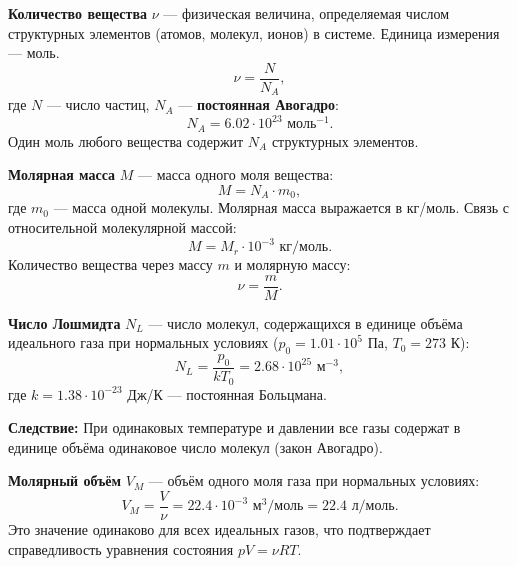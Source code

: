 \begin{definition}
\textbf{Количество вещества} $\nu$ --- физическая величина, определяемая числом структурных элементов (атомов, молекул, ионов) в системе. Единица измерения --- моль.
\begin{equation}
    \nu = \frac{N}{N_A},
\end{equation}
где $N$ --- число частиц, $N_A$ --- \textbf{постоянная Авогадро}:
\begin{equation}
    N_A = 6.02 \cdot 10^{23} \text{ моль}^{-1}.
\end{equation}
Один моль любого вещества содержит $N_A$ структурных элементов.
\end{definition}

\begin{definition}
\textbf{Молярная масса} $M$ --- масса одного моля вещества:
\begin{equation}
    M = N_A \cdot m_0,
\end{equation}
где $m_0$ --- масса одной молекулы. Молярная масса выражается в кг/моль. Связь с относительной молекулярной массой:
\begin{equation}
    M = M_r \cdot 10^{-3} \text{ кг/моль}.
\end{equation}
Количество вещества через массу $m$ и молярную массу:
\begin{equation}
    \nu = \frac{m}{M}.
\end{equation}
\end{definition}

\begin{property}
\textbf{Число Лошмидта} $N_L$ --- число молекул, содержащихся в единице объёма идеального газа при нормальных условиях ($p_0 = 1.01 \cdot 10^5$ Па, $T_0 = 273$ К):
\begin{equation}
    N_L = \frac{p_0}{k T_0} = 2.68 \cdot 10^{25} \text{ м}^{-3},
\end{equation}
где $k = 1.38 \cdot 10^{-23}$ Дж/К --- постоянная Больцмана.
\par\noindent\textbf{Следствие:} При одинаковых температуре и давлении все газы содержат в единице объёма одинаковое число молекул (закон Авогадро).
\end{property}

\begin{remark}
\textbf{Молярный объём} $V_M$ --- объём одного моля газа при нормальных условиях:
\begin{equation}
    V_M = \frac{V}{\nu} = 22.4 \cdot 10^{-3} \text{ м}^3/\text{моль} = 22.4 \text{ л/моль}.
\end{equation}
Это значение одинаково для всех идеальных газов, что подтверждает справедливость уравнения состояния $pV = \nu RT$.
\end{remark}
